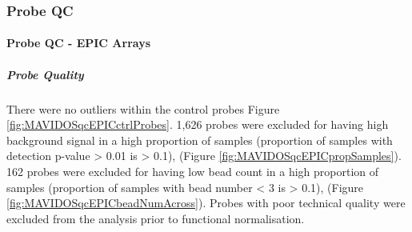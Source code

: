 \documentclass[
]{book}
\begin{document}
\hypertarget{probe-qc}{%
\subsubsection{Probe QC}\label{probe-qc}}

\hypertarget{probe-qc---epic-arrays}{%
\paragraph{Probe QC - EPIC Arrays}\label{probe-qc---epic-arrays}}

\hypertarget{probe-quality}{%
\subparagraph{Probe Quality}\label{probe-quality}}

There were no outliers within the control probes Figure \ref{fig:MAVIDOSqcEPICctrlProbes}.
1,626 probes were excluded for having high background signal in a high proportion of samples (proportion of samples with detection p-value \textgreater{} 0.01 is \textgreater{} 0.1), (Figure \ref{fig:MAVIDOSqcEPICpropSamples}).
162 probes were excluded for having low bead count in a high proportion of samples (proportion of samples with bead number \textless{} 3 is \textgreater{} 0.1), (Figure \ref{fig:MAVIDOSqcEPICbeadNumAcross}).
Probes with poor technical quality were excluded from the analysis prior to functional normalisation.
\end{document}
